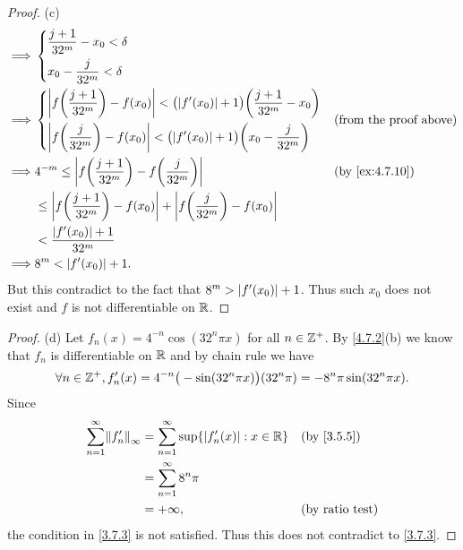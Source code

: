 \begin{proof}{(c)}
\begin{align*}
    \implies & \begin{dcases}
                 \dfrac{j + 1}{32^m} - x_0 < \delta \\
                 x_0 - \dfrac{j}{32^m} < \delta
               \end{dcases}                                                                                                             \\
    \implies & \begin{dcases}
                 \abs{f\bigg(\dfrac{j + 1}{32^m}\bigg) - f(x_0)} < \big(\abs{f'(x_0)} + 1\big) \bigg(\dfrac{j + 1}{32^m} - x_0\bigg) \\
                 \abs{f\bigg(\dfrac{j}{32^m}\bigg) - f(x_0)} < \big(\abs{f'(x_0)} + 1\big) \bigg(x_0 - \dfrac{j}{32^m}\bigg)
               \end{dcases} &  & \text{(from the proof above)}                        \\
    \implies & 4^{-m} \leq \abs{f\bigg(\dfrac{j + 1}{32^m}\bigg) - f\bigg(\dfrac{j}{32^m}\bigg)}                                          &  & \by{ex:4.7.10} \\
             & \leq \abs{f\bigg(\dfrac{j + 1}{32^m}\bigg) - f(x_0)} + \abs{f\bigg(\dfrac{j}{32^m}\bigg) - f(x_0)}                                             \\
             & < \dfrac{\abs{f'(x_0)} + 1}{32^m}                                                                                                              \\
    \implies & 8^m < \abs{f'(x_0)} + 1.
  \end{align*}
  But this contradict to the fact that \(8^m > \left\lvert f'(x_0)\right\rvert + 1\).
  Thus such \(x_0\) does not exist and \(f\) is not differentiable on \(\mathbb{R}\).
\end{proof}

\begin{proof}{(d)}
  Let \(f_n(x) = 4^{-n} \cos(32^n \pi x)\) for all \(n \in \mathbb{Z}^+\).
  By \cref{4.7.2}(b) we know that \(f_n\) is differentiable on \(\mathbb{R}\) and by chain rule we have
  \[
    \forall n \in \mathbb{Z}^+, f_n'(x) = 4^{-n} \big(-\sin(32^n \pi x)\big) (32^n \pi) = - 8^n \pi \sin(32^n \pi x).
  \]
  Since
  \begin{align*}
    \sum_{n = 1}^\infty \norm*{f_n'}_\infty & = \sum_{n = 1}^\infty \sup\set{\abs{f_n'(x)} : x \in \R} &  & \by{3.5.5}             \\
                                            & = \sum_{n = 1}^\infty 8^n \pi                                                        \\
                                            & = +\infty,                                               &  & \text{(by ratio test)}
  \end{align*}
  the condition in \cref{3.7.3} is not satisfied.
  Thus this does not contradict to \cref{3.7.3}.
\end{proof}